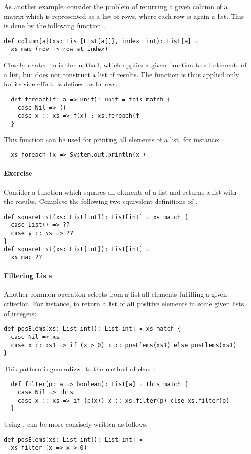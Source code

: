 \documentclass[a4paper,12pt,twoside,titlepage]{book}
\newcommand{\exercise}{\paragraph{Exercise}}
\begin{document}
As another example, consider the problem of returning a given column
of a matrix which is represented as a list of rows, where each row is
again a list. This is done by the following function .

\begin{lstlisting}
def column[a](xs: List[List[a[]], index: int): List[a] = 
  xs map (row => row at index)
\end{lstlisting}

Closely related to  is the  method, which
applies a given function to all elements of a list, but does not
construct a list of results. The function is thus applied only for its
side effect.  is defined as follows.
\begin{lstlisting}
  def foreach(f: a => unit): unit = this match {
    case Nil => ()
    case x :: xs => f(x) ; xs.foreach(f)
  }
\end{lstlisting}
This function can be used for printing all elements of a list, for instance:
\begin{lstlisting}
  xs foreach (x => System.out.println(x))
\end{lstlisting} 

\exercise Consider a function which squares all elements of a list and
returns a list with the results. Complete the following two equivalent
definitions of .

\begin{lstlisting}
def squareList(xs: List[int]): List[int] = xs match {
  case List() => ??
  case y :: ys => ??
}
def squareList(xs: List[int]): List[int] = 
  xs map ??
\end{lstlisting}

\paragraph{Filtering Lists}
Another common operation selects from a list all elements fulfilling a
given criterion. For instance, to return a list of all positive
elements in some given lists of integers:
\begin{lstlisting}
def posElems(xs: List[int]): List[int] = xs match {
  case Nil => xs
  case x :: xs1 => if (x > 0) x :: posElems(xs1) else posElems(xs1)
}
\end{lstlisting}
This pattern is generalized to the  method of class :
\begin{lstlisting}
  def filter(p: a => boolean): List[a] = this match {
    case Nil => this
    case x :: xs => if (p(x)) x :: xs.filter(p) else xs.filter(p)
  }
\end{lstlisting}
Using ,  can be more consisely written as
follows.
\begin{lstlisting}
def posElems(xs: List[int]): List[int] = 
  xs filter (x => x > 0)
\end{lstlisting}
\end{document}
